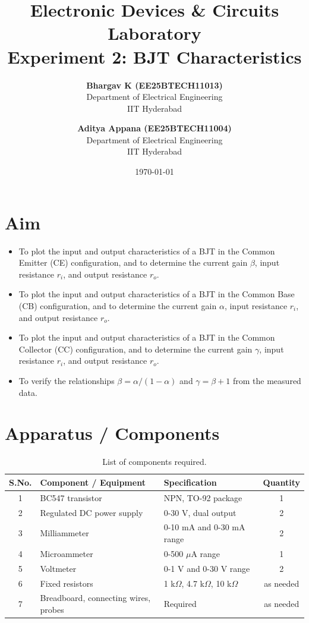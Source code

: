\documentclass[12pt,a4paper]{article}
\title{\textbf{Electronic Devices \& Circuits Laboratory \\ Experiment 2: BJT Characteristics}}
\author{
    \textbf{Bhargav K (EE25BTECH11013)} \\
    Department of Electrical Engineering \\
    IIT Hyderabad
    \and
    \textbf{Aditya Appana (EE25BTECH11004)} \\
    Department of Electrical Engineering \\
    IIT Hyderabad
}
\date{\today}
\begin{document}
\maketitle

\newpage
\tableofcontents
\newpage

\section{Aim}
\begin{itemize}
    \item To plot the input and output characteristics of a BJT in the Common Emitter (CE) configuration, and to determine the current gain $\beta$, input resistance $r_i$, and output resistance $r_o$.
    \item To plot the input and output characteristics of a BJT in the Common Base (CB) configuration, and to determine the current gain $\alpha$, input resistance $r_i$, and output resistance $r_o$.
    \item To plot the input and output characteristics of a BJT in the Common Collector (CC) configuration, and to determine the current gain $\gamma$, input resistance $r_i$, and output resistance $r_o$.
    \item To verify the relationships $\beta=\alpha/(1-\alpha)$ and $\gamma=\beta+1$ from the measured data.
\end{itemize}

\section{Apparatus / Components}
\begin{table}[H]
    \centering
    \begin{tabular}{|c|l|l|c|}
        \hline
        \textbf{S.No.} & \textbf{Component / Equipment} & \textbf{Specification} & \textbf{Quantity} \\ \hline
        1 & BC547 transistor & NPN, TO-92 package & 1 \\ \hline
        2 & Regulated DC power supply & 0-30 V, dual output & 2 \\ \hline
        3 & Milliammeter & 0-10 mA and 0-30 mA range & 2 \\ \hline
        4 & Microammeter & 0-500 $\mu$A range & 1 \\ \hline
        5 & Voltmeter & 0-1 V and 0-30 V range & 2 \\ \hline
        6 & Fixed resistors & 1 k$\Omega$, 4.7 k$\Omega$, 10 k$\Omega$ & as needed \\ \hline
        7 & Breadboard, connecting wires, probes & Required & as needed \\ \hline
    \end{tabular}
    \caption{List of components required.}
\end{table}
\end{document}
